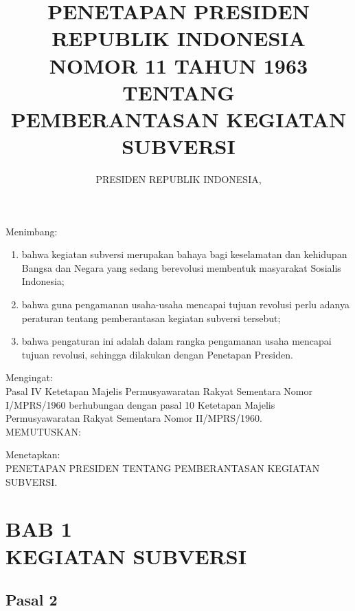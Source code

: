 \documentclass{article}
\title{PENETAPAN PRESIDEN REPUBLIK INDONESIA\\
	NOMOR 11 TAHUN 1963\\
	TENTANG\\
	PEMBERANTASAN KEGIATAN SUBVERSI}
\author{PRESIDEN REPUBLIK INDONESIA,}
\date{}
\begin{document}
\maketitle

Menimbang:

\renewcommand{\labelenumi}{(\alph{enumi}). }
\begin{enumerate}
\item bahwa kegiatan subversi merupakan bahaya bagi keselamatan dan kehidupan Bangsa dan Negara
yang sedang berevolusi membentuk masyarakat Sosialis Indonesia;
\item bahwa guna pengamanan usaha-usaha mencapai tujuan revolusi perlu adanya peraturan tentang
pemberantasan kegiatan subversi tersebut;
\item bahwa pengaturan ini adalah dalam rangka pengamanan usaha mencapai tujuan revolusi, sehingga
dilakukan dengan Penetapan Presiden.
\end{enumerate}

Mengingat:
\\

Pasal IV Ketetapan Majelis Permusyawaratan Rakyat Sementara Nomor I/MPRS/1960 berhubungan
dengan pasal 10 Ketetapan Majelis Permusyawaratan Rakyat Sementara Nomor II/MPRS/1960.
\\

\hspace{\fill}MEMUTUSKAN:\hspace{\fill}
\vspace{10pt}

Menetapkan:
\\

PENETAPAN PRESIDEN TENTANG PEMBERANTASAN KEGIATAN SUBVERSI.

\section*{\centering{}BAB 1\\KEGIATAN SUBVERSI}

\subsection*{\centering{}Pasal 2}
\end{document}
